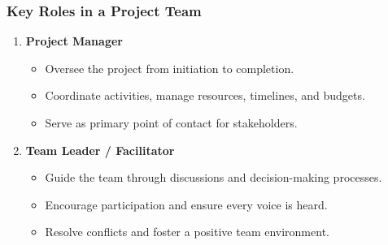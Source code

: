 \documentclass[aspectratio=169]{beamer}
\begin{document}
\begin{frame}[fragile]
    \frametitle{Key Roles in a Project Team}
    \begin{enumerate}
        \item \textbf{Project Manager}
        \begin{itemize}
            \item Oversee the project from initiation to completion.
            \item Coordinate activities, manage resources, timelines, and budgets.
            \item Serve as primary point of contact for stakeholders.
        \end{itemize}
        \item \textbf{Team Leader / Facilitator}
        \begin{itemize}
            \item Guide the team through discussions and decision-making processes.
            \item Encourage participation and ensure every voice is heard.
            \item Resolve conflicts and foster a positive team environment.
        \end{itemize}
    \end{enumerate}
\end{frame}
\end{document}
